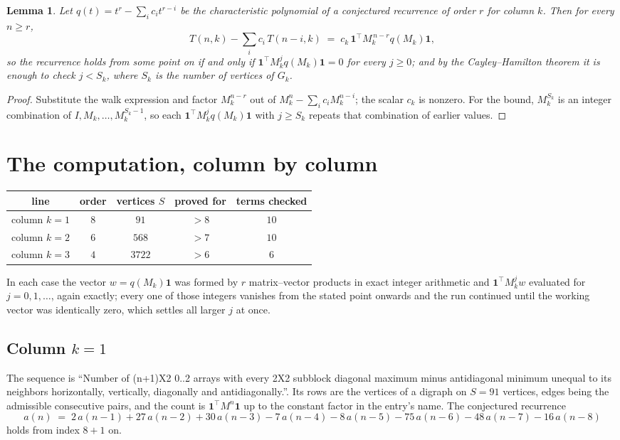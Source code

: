 \documentclass[11pt,a4paper]{article}
\theoremstyle{plain}
\newtheorem{lemma}[theorem]{Lemma}
\theoremstyle{definition}
\begin{document}
\begin{lemma}\label{lem:crit}
Let $q(t)=t^{r}-\sum_i c_it^{r-i}$ be the characteristic polynomial of a conjectured
recurrence of order $r$ for column $k$. Then for every $n\ge r$,
\[
T(n,k)-\sum_i c_i\,T(n-i,k)\;=\;c_k\,\mathbf{1}^{\!\top}M_k^{\,n-r}q(M_k)\mathbf{1},
\]
so the recurrence holds from some point on if and only if
$\mathbf{1}^{\!\top}M_k^{j}q(M_k)\mathbf{1}=0$ for every $j\ge0$; and by the
Cayley--Hamilton theorem it is enough to check $j<S_k$, where $S_k$ is the number of vertices
of $G_k$.
\end{lemma}

\begin{proof}
Substitute the walk expression and factor $M_k^{n-r}$ out of $M_k^{n}-\sum_ic_iM_k^{n-i}$;
the scalar $c_k$ is nonzero. For the bound, $M_k^{S_k}$ is an integer combination of
$I,M_k,\dots,M_k^{S_k-1}$, so each $\mathbf{1}^{\!\top}M_k^{j}q(M_k)\mathbf{1}$ with
$j\ge S_k$ repeats that combination of earlier values.
\end{proof}

\section{The computation, column by column}

\begin{center}
\begin{tabular}{ccccc}
line & order & vertices $S$ & proved for & terms checked \\ \hline
column $k$$=1$ & $8$ & $91$ & $>8$ & $10$ \\
column $k$$=2$ & $6$ & $568$ & $>7$ & $10$ \\
column $k$$=3$ & $4$ & $3722$ & $>6$ & $6$ \\
\end{tabular}
\end{center}

In each case the vector $w=q(M_k)\mathbf{1}$ was formed by $r$ matrix--vector products in
exact integer arithmetic and $\mathbf{1}^{\!\top}M_k^{j}w$ evaluated for $j=0,1,\dots$,
again exactly; every one of those integers vanishes from the stated point onwards and the run
continued until the working vector was identically zero, which settles all larger $j$ at once.

\subsection*{Column $k$$=1$}
The sequence is ``Number of (n+1)X2 0..2 arrays with every 2X2 subblock diagonal maximum minus antidiagonal minimum unequal to its neighbors horizontally, vertically, diagonally and antidiagonally.''. Its rows are the vertices of a digraph on
$S=91$ vertices, edges being the admissible consecutive pairs, and the count is
$\mathbf{1}^{\!\top}M^{n}\mathbf{1}$ up to the constant factor in the entry's name.
The conjectured recurrence
\[
a(n)\;=\;2\,a(n-1) + 27\,a(n-2) + 30\,a(n-3) - 7\,a(n-4) - 8\,a(n-5) - 75\,a(n-6) - 48\,a(n-7) - 16\,a(n-8)
\]
holds from index $8+1$ on.
\end{document}
